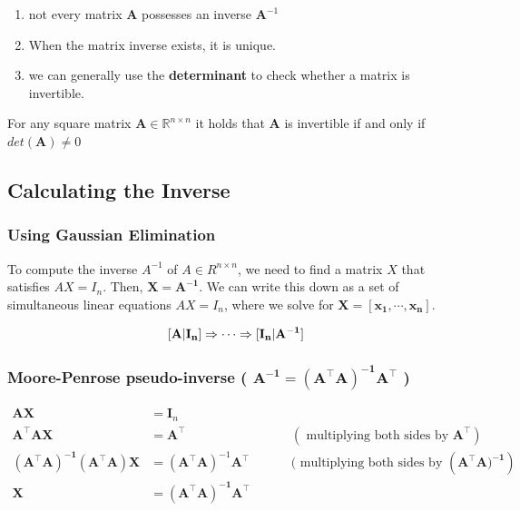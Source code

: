 \begin{enumerate}
    \item not every matrix $\mathbf{A}$ possesses an inverse $\mathbf{A}^{-1}$

    \item When the matrix inverse exists, it is unique.
    
    \item we can generally use the \textbf{determinant} to check whether a matrix is invertible.
\end{enumerate}

\begin{theorem}
    For any square matrix $\mathbf{A} \in \mathbb{R}^{n\times n}$ it holds that $\mathbf{A}$ is invertible if and only if $det(\mathbf{A}) \neq 0$
\end{theorem}

\subsection{Calculating the Inverse \cite{mfml-1}}

\subsubsection{Using Gaussian Elimination}
To compute the inverse $A^{-1}$ of $A \in R^{n\times n}$, we need to find a matrix $X$ that satisfies $AX=I_n$. Then, $\mathbf{X = A^{-1}}$. We can write this down as a set of simultaneous linear equations $AX=I_n$, where we solve for $\mathbf{X = [x_1,\cdots,x_n]}$.

\[
    \displaystyle
    \hfill
    \mathbf{[A|I_n] \Rightarrow \cdots \Rightarrow [I_n|A^{-1}]}
    \hfill
\]

\subsubsection{Moore-Penrose pseudo-inverse ( $\mathbf{A^{-1} = (A^\top A)^{-1}A^\top }$ ) \cite{mfml-1}} \label{Moore-Penrose pseudo-inverse}

\begin{align*}
    \mathbf{AX} &= \mathbf{I}_n \\
    \mathbf{A^\top AX} &= \mathbf{A^\top} &&&& (\text{ multiplying both sides by } \mathbf{A^\top}) \\
    \mathbf{(A^\top A)^{-1}(A^\top A)X} &= (\mathbf{A^\top A})^{-1}\mathbf{A^\top} &&&& (\text{ multiplying both sides by } (\mathbf{A^\top A)^{-1}}) \\
    \mathbf{X} &= \mathbf{(A^\top A)^{-1}A^\top }
\end{align*}


